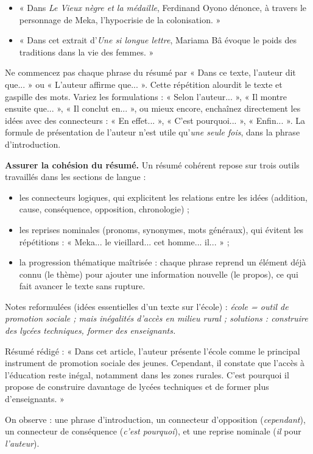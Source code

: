 \documentclass[11pt]{article}
\newcommand{\cle}[1]{{\popxbold\color{popdark}#1}}
\begin{document}
\begin{itemize}
\item « Dans \emph{Le Vieux nègre et la médaille}, Ferdinand Oyono dénonce, à travers le personnage de Meka, l'hypocrisie de la colonisation. »
\item « Dans cet extrait d'\emph{Une si longue lettre}, Mariama Bâ évoque le poids des traditions dans la vie des femmes. »
\end{itemize}

\begin{attention}
Ne commencez pas chaque phrase du résumé par « Dans ce texte, l'auteur dit que... » ou « L'auteur affirme que... ». Cette répétition alourdit le texte et gaspille des mots. Variez les formulations : « Selon l'auteur... », « Il montre ensuite que... », « Il conclut en... », ou mieux encore, enchaînez directement les idées avec des connecteurs : « En effet... », « C'est pourquoi... », « Enfin... ». La formule de présentation de l'auteur n'est utile qu'\emph{une seule fois}, dans la phrase d'introduction.
\end{attention}

\textbf{Assurer la cohésion du résumé.} Un résumé cohérent repose sur trois outils travaillés dans les sections de langue :

\begin{itemize}
\item les \cle{connecteurs logiques}, qui explicitent les relations entre les idées (addition, cause, conséquence, opposition, chronologie) ;
\item les \cle{reprises nominales} (pronoms, synonymes, mots généraux), qui évitent les répétitions : « Meka... le vieillard... cet homme... il... » ;
\item la \cle{progression thématique} maîtrisée : chaque phrase reprend un élément déjà connu (le thème) pour ajouter une information nouvelle (le propos), ce qui fait avancer le texte sans rupture.
\end{itemize}

\begin{exemplebox}
Notes reformulées (idées essentielles d'un texte sur l'école) : \emph{école = outil de promotion sociale ; mais inégalités d'accès en milieu rural ; solutions : construire des lycées techniques, former des enseignants.}

Résumé rédigé : « Dans cet article, l'auteur présente l'école comme le principal instrument de promotion sociale des jeunes. Cependant, il constate que l'accès à l'éducation reste inégal, notamment dans les zones rurales. C'est pourquoi il propose de construire davantage de lycées techniques et de former plus d'enseignants. »

On observe : une phrase d'introduction, un connecteur d'opposition (\emph{cependant}), un connecteur de conséquence (\emph{c'est pourquoi}), et une reprise nominale (\emph{il} pour \emph{l'auteur}).
\end{exemplebox}
\end{document}
